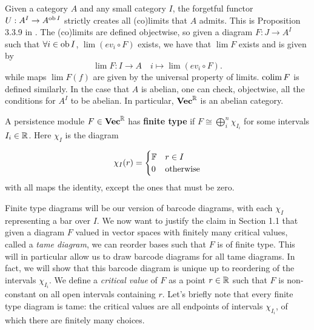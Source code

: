 Given a category $A$ and any small category $I$, the forgetful functor $U:A^I\rightarrow A^{\operatorname{ob} I}$ strictly creates all (co)limits that $A$ admits. This is Proposition 3.3.9 in \cite{Riehl}. The (co)limits are defined objectwise, so given a diagram $F:J\rightarrow A^I$ such that $\forall i\in \operatorname{ob} I$, $\lim (ev_i\circ F)$ exists, we have that $\lim F$ exists and is given by
$$\lim F:I\rightarrow A \quad i\mapsto \lim(ev_i\circ F).$$
while maps $\lim F(f)$ are given by the universal property of limits. $\operatorname*{colim} F$ is defined similarly. In the case that $A$ is abelian, one can check, objectwise, all the conditions for $A^I$ to be abelian. In particular, $\mathbf{Vec}^{\mathbb{R}}$ is an abelian category.

\begin{definition}
    A persistence module $F\in \mathbf{Vec}^{\mathbb{R}}$ has \textbf{finite type} if $F\cong \bigoplus^n_i \chi_{I_i}$ for some intervals $I_i\in \mathbb{R} $. Here $\chi_I$ is the diagram

    $$\chi_I(r)=\begin{cases} 
      \mathbb{F} & r\in I \\
      0 & \text{otherwise} 
   \end{cases}$$
   with all maps the identity, except the ones that must be zero.
\end{definition}
Finite type diagrams will be our version of barcode diagrams, with each $\chi_I$ representing a bar over $I$. We now want to justify the claim in Section 1.1 that given a diagram $F$ valued in vector spaces with finitely many critical values, called a \textit{tame diagram}, we can reorder bases such that $F$ is of finite type. This will in particular allow us to draw barcode diagrams for all tame diagrams. In fact, we will show that this barcode diagram is unique up to reordering of the intervals $\chi_{I_i}$.  We define a \textit{critical value} of $F$ as a point $r\in \mathbb{R}$ such that $F$ is non-constant on all open intervals containing $r$. Let's briefly note that every finite type diagram is tame: the critical values are all endpoints of intervals $\chi_{I_i}$, of which there are finitely many choices.

